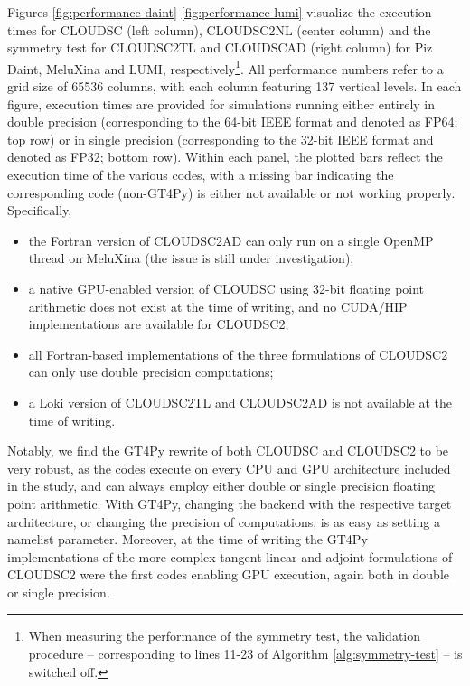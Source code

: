 \documentclass[main.tex]{subfiles}
\begin{document}
        Figures \ref{fig:performance-daint}-\ref{fig:performance-lumi} visualize the execution times for CLOUDSC (left column), CLOUDSC2NL  (center column) and the symmetry test for CLOUDSC2TL and CLOUDSCAD (right column) for Piz Daint, MeluXina and LUMI, respectively\footnote{When measuring the performance of the symmetry test, the validation procedure -- corresponding to lines 11-23 of Algorithm \ref{alg:symmetry-test} -- is switched off.}. All performance numbers refer to a grid size of 65536 columns, with each column featuring 137 vertical levels. In each figure, execution times are provided for simulations running either entirely in double precision (corresponding to the 64-bit IEEE format and denoted as FP64; top row) or in single precision (corresponding to the 32-bit IEEE format and denoted as FP32; bottom row). Within each panel, the plotted bars reflect the execution time of the various codes, with a missing bar indicating the corresponding code (non-GT4Py) is either not available or not working properly. Specifically,
        \begin{itemize}
            \item the Fortran version of CLOUDSC2AD can only run on a single OpenMP thread on MeluXina (the issue is still under investigation);
            \item a native GPU-enabled version of CLOUDSC using 32-bit floating point arithmetic does not exist at the time of writing, and no CUDA/HIP implementations are available for CLOUDSC2;
            \item all Fortran-based implementations of the three formulations of CLOUDSC2 can only use double precision computations;
            \item a Loki version of CLOUDSC2TL and CLOUDSC2AD is not available at the time of writing.
        \end{itemize}

        \noindent Notably, we find the GT4Py rewrite of both CLOUDSC and CLOUDSC2 to be very robust, as the codes execute on every CPU and GPU architecture included in the study, and can always employ either double or single precision floating point arithmetic. With GT4Py, changing the backend with the respective target architecture, or changing the precision of computations, is as easy as setting a namelist parameter. Moreover, at the time of writing the GT4Py implementations of the more complex tangent-linear and adjoint formulations of CLOUDSC2 were the first codes enabling GPU execution, again both in double or single precision.
\end{document}
